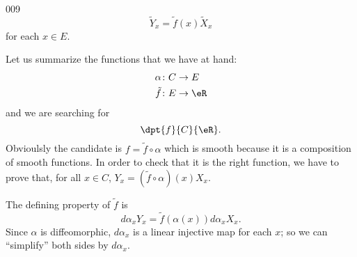 \begin{corrige}{009}
\begin{equation} \label{eq_tildeffx}
\tilde Y_x=\tilde f(x)\tilde X_x
\end{equation}
for each $x\in E$. 

Let us summarize the functions that we have at hand:
\[
\begin{split}
	\alpha\colon C&\to E\\
	\tilde f\colon E&\to \eR
\end{split}
\]
and we are searching for 
\[ 
  \dpt{ f }{ C }{ \eR }. 
\]
Obvioulsly the candidate is $f=\tilde f\circ\alpha$ which is smooth because it is a composition of smooth functions. In order to check that it is the right function, we have to prove that, for all $x\in C$, $Y_x=(\tilde f\circ\alpha)(x)X_x$.

The defining property of $\tilde f$ is 
\[ 
  d\alpha_x Y_x=\tilde f(\alpha(x))d\alpha_xX_x.
\]
Since $\alpha$ is diffeomorphic, $d\alpha_x$ is a linear injective map for each $x$; so we can ``simplify'' both sides by $d\alpha_x$.


\end{corrige}
